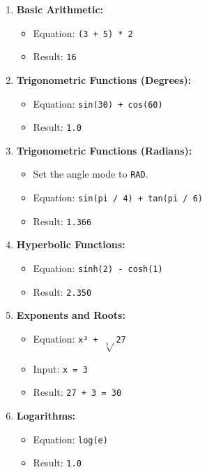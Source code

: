 \documentclass[a4paper,12pt]{article}
\begin{document}
\begin{enumerate}
    \item \textbf{Basic Arithmetic:}
    \begin{itemize}
        \item Equation: \texttt{(3 + 5) * 2}
        \item Result: \texttt{16}
    \end{itemize}

    \item \textbf{Trigonometric Functions (Degrees):}
    \begin{itemize}
        \item Equation: \texttt{sin(30) + cos(60)}
        \item Result: \texttt{1.0}
    \end{itemize}

    \item \textbf{Trigonometric Functions (Radians):}
    \begin{itemize}
        \item Set the angle mode to \texttt{RAD}.
        \item Equation: \texttt{sin(pi / 4) + tan(pi / 6)}
        \item Result: \texttt{1.366}
    \end{itemize}

    \item \textbf{Hyperbolic Functions:}
    \begin{itemize}
        \item Equation: \texttt{sinh(2) - cosh(1)}
        \item Result: \texttt{2.350}
    \end{itemize}

    \item \textbf{Exponents and Roots:}
    \begin{itemize}
        \item Equation: \texttt{x³ + \(\sqrt[3]{}\)27}
        \item Input: \texttt{x = 3}
        \item Result: \texttt{27 + 3 = 30}
    \end{itemize}

    \item \textbf{Logarithms:}
    \begin{itemize}
        \item Equation: \texttt{log(e)}
        \item Result: \texttt{1.0}
    \end{itemize}


\end{enumerate}
\end{document}

